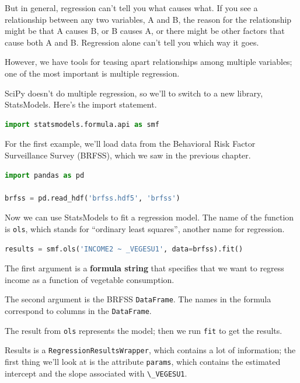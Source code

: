 But in general, regression can't tell you what causes what. If you see a
relationship between any two variables, A and B, the reason for the
relationship might be that A causes B, or B causes A, or there might be
other factors that cause both A and B. Regression alone can't tell you
which way it goes.

However, we have tools for teasing apart relationships among multiple
variables; one of the most important is multiple regression.

SciPy doesn't do multiple regression, so we'll to switch to a new
library, StatsModels. Here's the import statement.

\begin{lstlisting}[language=Python,style=source]
import statsmodels.formula.api as smf
\end{lstlisting}

For the first example, we'll load data from the Behavioral Risk Factor
Surveillance Survey (BRFSS), which we saw in the previous chapter.

\begin{lstlisting}[language=Python,style=source]
import pandas as pd

brfss = pd.read_hdf('brfss.hdf5', 'brfss')
\end{lstlisting}

Now we can use StatsModels to fit a regression model. The name of the
function is \passthrough{\lstinline!ols!}, which stands for ``ordinary
least squares'', another name for regression.

\begin{lstlisting}[language=Python,style=source]
results = smf.ols('INCOME2 ~ _VEGESU1', data=brfss).fit()
\end{lstlisting}

The first argument is a \textbf{formula string} that specifies that we
want to regress income as a function of vegetable consumption.

The second argument is the BRFSS \passthrough{\lstinline!DataFrame!}.
The names in the formula correspond to columns in the
\passthrough{\lstinline!DataFrame!}.

The result from \passthrough{\lstinline!ols!} represents the model; then
we run \passthrough{\lstinline!fit!} to get the results.

Results is a \passthrough{\lstinline!RegressionResultsWrapper!}, which
contains a lot of information; the first thing we'll look at is the
attribute \passthrough{\lstinline!params!}, which contains the estimated
intercept and the slope associated with
\passthrough{\lstinline!\_VEGESU1!}.

